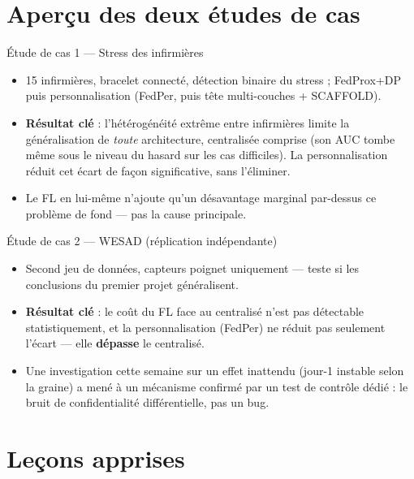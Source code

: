 \documentclass[aspectratio=169,11pt]{beamer}
\begin{document}
\section{Aperçu des deux études de cas}

\begin{frame}{Étude de cas 1 --- Stress des infirmières}
  \small
  \begin{itemize}
    \item 15 infirmières, bracelet connecté, détection binaire du stress ;
      FedProx+DP puis personnalisation (FedPer, puis tête multi-couches +
      SCAFFOLD).
    \item \textbf{Résultat clé} : l'hétérogénéité extrême entre infirmières
      limite la généralisation de \emph{toute} architecture, centralisée
      comprise (son AUC tombe même sous le niveau du hasard sur les cas
      difficiles). La personnalisation réduit cet écart de façon
      significative, sans l'éliminer.
    \item Le FL en lui-même n'ajoute qu'un désavantage marginal par-dessus
      ce problème de fond --- pas la cause principale.
  \end{itemize}
\end{frame}

\begin{frame}{Étude de cas 2 --- WESAD (réplication indépendante)}
  \small
  \begin{itemize}
    \item Second jeu de données, capteurs poignet uniquement --- teste si
      les conclusions du premier projet généralisent.
    \item \textbf{Résultat clé} : le coût du FL face au centralisé n'est pas
      détectable statistiquement, et la personnalisation (FedPer) ne
      réduit pas seulement l'écart --- elle \textbf{dépasse} le centralisé.
    \item Une investigation cette semaine sur un effet inattendu (jour-1
      instable selon la graine) a mené à un mécanisme confirmé par un test
      de contrôle dédié : le bruit de confidentialité différentielle,
      pas un bug.
  \end{itemize}
\end{frame}

\section{Leçons apprises}
\end{document}
